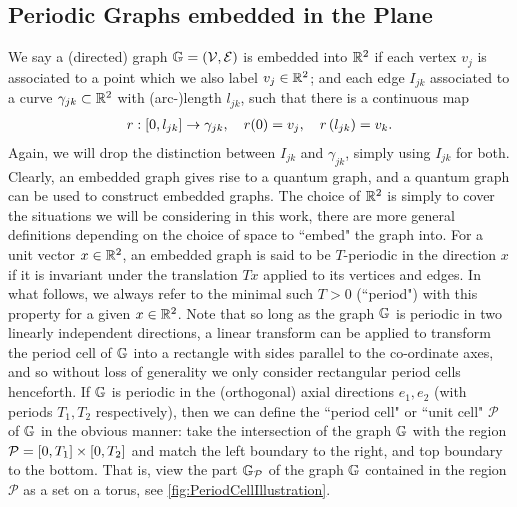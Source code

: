 \subsection*{Periodic Graphs embedded in the Plane} \label{ssec:EmbeddedGraphs}
We say a (directed) graph $\mathbb{G} = \left( \mathcal{V},\mathcal{E} \right)$ is embedded into $\mathbb{R}^2$ if each vertex $v_j$ is associated to a point which we also label $v_j\in\mathbb{R}^2$; and each edge $I_{jk}$ associated to a curve $\gamma_{jk}\subset\mathbb{R}^2$ with (arc-)length $l_{jk}$, such that there is a continuous map
\begin{align} \label{eq:GeneralCurveParam}
	r: \left[ 0,l_{jk} \right] \rightarrow \gamma_{jk}, \quad r(0) = v_j, \quad r\left( l_{jk} \right) = v_k.
\end{align}
Again, we will drop the distinction between $I_{jk}$ and $\gamma_{jk}$, simply using $I_{jk}$ for both.
Clearly, an embedded graph gives rise to a quantum graph, and a quantum graph can be used to construct embedded graphs.
The choice of $\mathbb{R}^2$ is simply to cover the situations we will be considering in this work, there are more general definitions depending on the choice of space to ``embed" the graph into.
For a unit vector $x\in\mathbb{R}^2$, an embedded graph is said to be $T$-periodic in the direction $x$ if it is invariant under the translation $Tx$ applied to its vertices and edges.
In what follows, we always refer to the minimal such $T>0$ (``period") with this property for a given $x\in\mathbb{R}^2$.
Note that so long as the graph $\mathbb{G}$ is periodic in two linearly independent directions, a linear transform can be applied to transform the period cell of $\mathbb{G}$ into a rectangle with sides parallel to the co-ordinate axes, and so without loss of generality we only consider rectangular period cells henceforth.
If $\mathbb{G}$ is periodic in the (orthogonal) axial directions $e_1, e_2$ (with periods $T_1, T_2$ respectively), then we can define the ``period cell" or ``unit cell" $\mathcal{P}$ of $\mathbb{G}$ in the obvious manner: take the intersection of the graph $\mathbb{G}$ with the region $\mathcal{P} = \left[ 0,T_1 \right]\times\left[ 0,T_2 \right]$ and match the left boundary to the right, and top boundary to the bottom.
That is, view the part $\mathbb{G}_{\mathcal{P}}$ of the graph $\mathbb{G}$ contained in the region $\mathcal{P}$ as a set on a torus, see \ref{fig:PeriodCellIllustration}.
